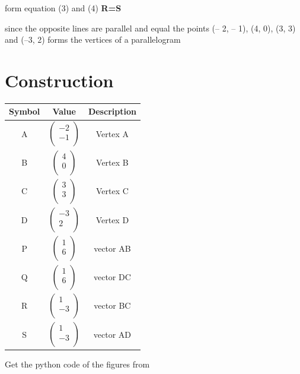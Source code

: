\documentclass[journal,12pt,twocolumn]{IEEEtran}
\begin{document}
form equation (3) and (4) \textbf{R=S}
\vspace{0.2cm}

since the opposite lines are parallel and equal the points (– 2, – 1), (4, 0), (3, 3) and (–3, 2) forms the vertices of a parallelogram

\section*{Construction}
\centering
\vspace{0.2cm}
{
\setlength\extrarowheight{2pt}
\begin{tabular}{|c|c|c|}
	\hline
	\textbf{Symbol}&\textbf{Value}&\textbf{Description}\\
	\hline
	A & $\begin{pmatrix}-2 \\ -1 \\ \end{pmatrix}$ & Vertex A\\
	\hline
	B & $\begin{pmatrix}4 \\ 0 \\ \end{pmatrix}$ & Vertex B\\
	\hline
	C &$\begin{pmatrix}3 \\ 3 \\ \end{pmatrix}$ & Vertex C\\
	\hline
	D & $\begin{pmatrix}-3 \\ 2 \\ \end{pmatrix}$ & Vertex D\\
	\hline
	P &$\begin{pmatrix}1 \\ 6 \\ \end{pmatrix}$&vector AB\\
	\hline
	Q&$\begin{pmatrix}1 \\ 6 \\ \end{pmatrix}$&vector DC\\
	\hline
	R&$\begin{pmatrix}1 \\ -3 \\ \end{pmatrix}$&vector BC\\
	\hline
	S&$\begin{pmatrix}1 \\ -3 \\ \end{pmatrix}$&vector AD\\
	\hline
\end{tabular}
}

\vspace{0.6cm}
Get the python code of the figures from
\begin{table}[h]
\large
\centering
{}


\end{table}
\end{document}
